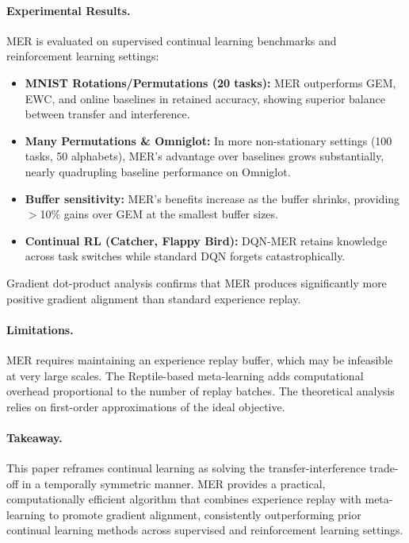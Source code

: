 \documentclass[12pt]{article}
\begin{document}
\paragraph{Experimental Results.}
MER is evaluated on supervised continual learning benchmarks and reinforcement
learning settings:

\begin{itemize}
		\item \textbf{MNIST Rotations/Permutations (20 tasks):} MER outperforms
				GEM, EWC, and online baselines in retained accuracy, showing superior
				balance between transfer and interference.
		\item \textbf{Many Permutations \& Omniglot:} In more non-stationary
				settings (100 tasks, 50 alphabets), MER's advantage over baselines
				grows substantially, nearly quadrupling baseline performance on Omniglot.
		\item \textbf{Buffer sensitivity:} MER's benefits increase as the buffer
				shrinks, providing $>$10\% gains over GEM at the smallest buffer sizes.
		\item \textbf{Continual RL (Catcher, Flappy Bird):} DQN-MER retains
				knowledge across task switches while standard DQN forgets
				catastrophically.
\end{itemize}

Gradient dot-product analysis confirms that MER produces significantly more
positive gradient alignment than standard experience replay.

\paragraph{Limitations.}
MER requires maintaining an experience replay buffer, which may be infeasible
at very large scales. The Reptile-based meta-learning adds computational
overhead proportional to the number of replay batches. The theoretical
analysis relies on first-order approximations of the ideal objective.

\paragraph{Takeaway.}
This paper reframes continual learning as solving the transfer-interference
trade-off in a temporally symmetric manner. MER provides a practical,
computationally efficient algorithm that combines experience replay with
meta-learning to promote gradient alignment, consistently outperforming
prior continual learning methods across supervised and reinforcement
learning settings.
\end{document}
